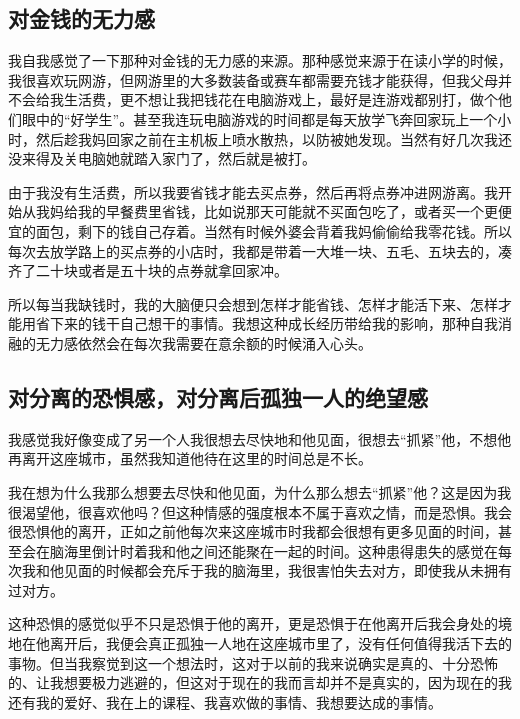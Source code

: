 


\subsection*{对金钱的无力感}

我自我感觉了一下那种对金钱的无力感的来源。那种感觉来源于在读小学的时候，我很喜欢玩网游，但网游里的大多数装备或赛车都需要充钱才能获得，但我父母并不会给我生活费，更不想让我把钱花在电脑游戏上，最好是连游戏都别打，做个他们眼中的“好学生”。甚至我连玩电脑游戏的时间都是每天放学飞奔回家玩上一个小时，然后趁我妈回家之前在主机板上喷水散热，以防被她发现。当然有好几次我还没来得及关电脑她就踏入家门了，然后就是被打。

由于我没有生活费，所以我要省钱才能去买点券，然后再将点券冲进网游离。我开始从我妈给我的早餐费里省钱，比如说那天可能就不买面包吃了，或者买一个更便宜的面包，剩下的钱自己存着。当然有时候外婆会背着我妈偷偷给我零花钱。所以每次去放学路上的买点券的小店时，我都是带着一大堆一块、五毛、五块去的，凑齐了二十块或者是五十块的点券就拿回家冲。

所以每当我缺钱时，我的大脑便只会想到怎样才能省钱、怎样才能活下来、怎样才能用省下来的钱干自己想干的事情。我想这种成长经历带给我的影响，那种自我消融的无力感依然会在每次我需要在意余额的时候涌入心头。




\subsection*{对分离的恐惧感，对分离后孤独一人的绝望感}

我感觉我好像变成了另一个人\pozhehao{}我很想去尽快地和他见面，很想去“抓紧”他，不想他再离开这座城市，虽然我知道他待在这里的时间总是不长。

我在想为什么我那么想要去尽快和他见面，为什么那么想去“抓紧”他？这是因为我很渴望他，很喜欢他吗？但这种情感的强度根本不属于喜欢之情，而是恐惧。我会很恐惧他的离开，正如之前他每次来这座城市时我都会很想有更多见面的时间，甚至会在脑海里倒计时着我和他之间还能聚在一起的时间。这种患得患失的感觉在每次我和他见面的时候都会充斥于我的脑海里，我很害怕失去对方，即使我从未拥有过对方。

这种恐惧的感觉似乎不只是恐惧于他的离开，更是恐惧于在他离开后我会身处的境地\pozhehao{}在他离开后，我便会真正孤独一人地在这座城市里了，没有任何值得我活下去的事物。但当我察觉到这一个想法时，这对于以前的我来说确实是真的、十分恐怖的、让我想要极力逃避的，但这对于现在的我而言却并不是真实的，因为现在的我还有我的爱好、我在上的课程、我喜欢做的事情、我想要达成的事情。

